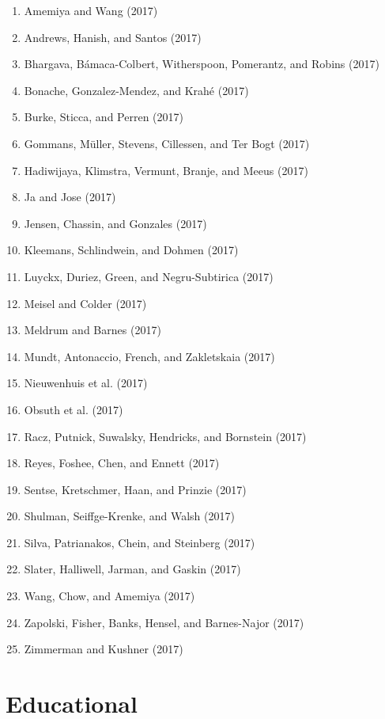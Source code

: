 \documentclass[english,man]{apa6}
\providecommand{\tightlist}{%
  \setlength{\itemsep}{0pt}\setlength{\parskip}{0pt}}
\begin{document}
\begin{enumerate}
\def\labelenumi{\arabic{enumi})}
\tightlist
\item
  Amemiya and Wang (2017)
\item
  Andrews, Hanish, and Santos (2017)
\item
  Bhargava, Bámaca-Colbert, Witherspoon, Pomerantz, and Robins (2017)
\item
  Bonache, Gonzalez-Mendez, and Krahé (2017)
\item
  Burke, Sticca, and Perren (2017)
\item
  Gommans, Müller, Stevens, Cillessen, and Ter Bogt (2017)
\item
  Hadiwijaya, Klimstra, Vermunt, Branje, and Meeus (2017)
\item
  Ja and Jose (2017)
\item
  Jensen, Chassin, and Gonzales (2017)
\item
  Kleemans, Schlindwein, and Dohmen (2017)
\item
  Luyckx, Duriez, Green, and Negru-Subtirica (2017)
\item
  Meisel and Colder (2017)
\item
  Meldrum and Barnes (2017)
\item
  Mundt, Antonaccio, French, and Zakletskaia (2017)
\item
  Nieuwenhuis et al. (2017)
\item
  Obsuth et al. (2017)
\item
  Racz, Putnick, Suwalsky, Hendricks, and Bornstein (2017)
\item
  Reyes, Foshee, Chen, and Ennett (2017)
\item
  Sentse, Kretschmer, Haan, and Prinzie (2017)
\item
  Shulman, Seiffge-Krenke, and Walsh (2017)
\item
  Silva, Patrianakos, Chein, and Steinberg (2017)
\item
  Slater, Halliwell, Jarman, and Gaskin (2017)
\item
  Wang, Chow, and Amemiya (2017)
\item
  Zapolski, Fisher, Banks, Hensel, and Barnes-Najor (2017)
\item
  Zimmerman and Kushner (2017)
\end{enumerate}

\section{Educational}\label{educational}
\end{document}
